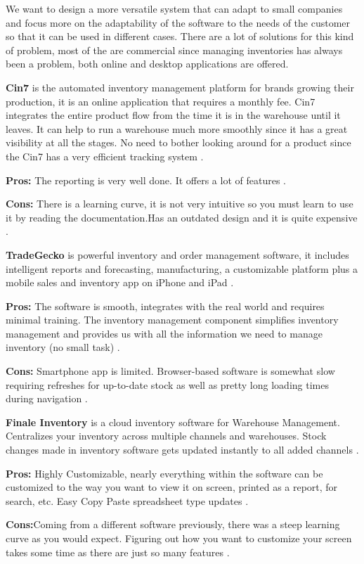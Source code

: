 We want to design a more versatile system that can adapt to small companies and focus more on the adaptability of the software to the needs of the customer so that it can be used in different cases. There are a lot of  solutions for this kind of problem, most of the are commercial since managing inventories has always been a problem, both online and desktop applications are offered.

\textbf{Cin7} is the automated inventory management platform for brands growing their production, it is an online application that requires a monthly fee.
Cin7 integrates the entire product flow from the time it is in the warehouse until it leaves. It can help to run a warehouse much more smoothly since it has a great visibility at all the stages. No need to bother looking around for a product since the Cin7 has a very efficient tracking system \cite{cin7}.

\textbf{Pros:} The reporting is very well done. It offers a lot of features \cite{cin7Re}.

\textbf{Cons:} There is a learning curve, it is not very intuitive so you must learn to use it by reading the documentation.Has an outdated design and it is quite expensive \cite{cin7Re}.

\textbf{TradeGecko} is powerful inventory and order management software, it includes intelligent reports and forecasting, manufacturing, a customizable platform plus a mobile sales and inventory app on iPhone and iPad \cite{Gecko}.

\textbf{Pros:} The software is smooth, integrates with the real world and requires minimal training. The inventory management component simplifies inventory management and provides us with all the information we need to manage inventory (no small task) \cite{geckoRe}.

\textbf{Cons:} Smartphone app is limited. Browser-based software is somewhat slow requiring refreshes for up-to-date stock as well as pretty long loading times during navigation \cite{geckoRe}.

\textbf{Finale Inventory} is a cloud inventory software for Warehouse Management. Centralizes your inventory across multiple channels and warehouses. Stock changes made in inventory software gets updated instantly to all added channels \cite{Finale}.

\textbf{Pros:} Highly Customizable, nearly everything within the software can be customized to the way you want to view it on screen, printed as a report, for search, etc. Easy Copy Paste spreadsheet type updates \cite{FinaleRe}.

\textbf{Cons:}Coming from a different software previously, there was a steep learning curve as you would expect. Figuring out how you want to customize your screen takes some time as there are just so many features \cite{FinaleRe}. 

